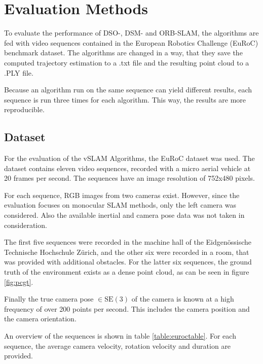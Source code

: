 \section{Evaluation Methods}\label{methsec}

To evaluate the performance of DSO-, DSM- and ORB-SLAM, the algorithms are fed with video sequences contained in the 
European Robotics Challenge (EuRoC) benchmark dataset. The algorithms are changed in a way, that they save the computed 
trajectory estimation to a .txt file and the resulting point cloud to a .PLY file. 

Because an algorithm run on the same sequence can yield different results, each sequence is run three times for each algorithm. 
This way, the results are more reproducible. 

\subsection{Dataset}

	For the evaluation of the vSLAM Algorithms, the EuRoC dataset \cite{euroc} was used.
	The dataset contains eleven video sequences, recorded with a micro aerial vehicle at 20 frames per second.
	The sequences have an image resolution of 752x480 pixels.
	
	For each sequence, RGB images from two cameras exist. However, since the evaluation
	focuses on monocular SLAM methods, only the left camera was considered. Also the available 
	inertial and camera pose data was not taken in consideration. 
	
	The first five sequences were recorded in 
	the machine hall of the Eidgenössische Technische Hochschule Zürich, and the other six were recorded in a room, that was provided 
	with additional obstacles. For the latter six sequences, the ground truth of the environment 
	exists as a dense point cloud, as can be seen in figure \ref{fig:pcgt}.


	Finally the true camera pose $\in \text{SE}(3)$ of the 
	camera is known at a high frequency of over 200 points per second. This includes the camera position and the camera orientation. 
	
	An overview of the sequences is shown in table \ref{table:euroctable}. For each sequence, the average camera velocity,
	rotation velocity and duration 
	are provided. 




